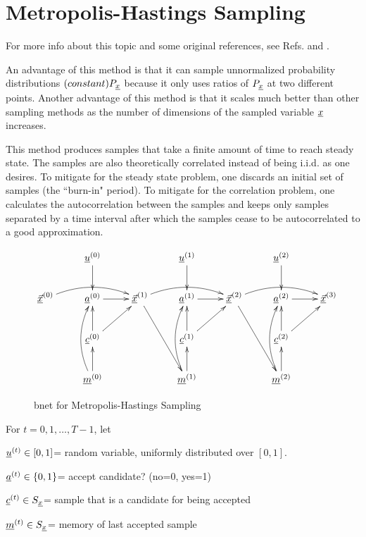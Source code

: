 \section{Metropolis-Hastings Sampling}

For more info about this topic and 
some original references, 
see Refs.\cite{bendel-metro-hast}
and \cite{wiki-metro-hast}.

An advantage of this method is that it can sample
unnormalized probability distributions
$(constant)P_{\underline{x}}$ 
because it 
only uses ratios of
$P_{\underline{x}}$ at two different points.
Another advantage
of this method
is that it scales much 
better than other sampling
methods as the number
of dimensions of the
sampled variable ${\underline{x}}$
increases.

This method produces samples that 
take a finite amount of
time to reach steady state. The samples
are also
theoretically correlated instead
of being i.i.d. as one desires.
To mitigate for the steady state problem,
one discards an initial set
of samples (the ``burn-in" period).
To mitigate for the correlation problem,
one calculates the autocorrelation
between the samples
and keeps only samples separated
by a time interval 
after which the samples 
cease to be autocorrelated to
a good approximation.



\begin{figure}[h!]
$$\xymatrix{
&\rvu^{(0)}\ar[d]
&&\rvu^{(1)}\ar[d]
&&\rvu^{(2)}\ar[d]
\\
\ul{\vecx}^{(0)}\ar@/^1pc/[rr]
&\rva^{(0)}\ar[r]
&
\ul{\vecx}^{(1)}\ar@/^1pc/[rr]\ar[rdd]
&\rva^{(1)}\ar[r]
&
\ul{\vecx}^{(2)}\ar@/^1pc/[rr]\ar[rdd]
&\rva^{(2)}\ar[r]
&\ul{\vecx}^{(3)}
\\
&\rvc^{(0)}\ar[u]\ar[ru]
&&\rvc^{(1)}\ar[u]\ar[ru]
&&\rvc^{(2)}\ar[u]\ar[ru]
\\
&\rvm^{(0)}\ar[u]\ar@/^1pc/[uu]
&&\rvm^{(1)}\ar[u]\ar@/^1pc/[uu]
&&\rvm^{(2)}\ar[u]\ar@/^1pc/[uu]
}$$
\caption{bnet for Metropolis-Hastings Sampling}
\label{fig-mcmc-metro-bnet}
\end{figure}

For $t=0, 1, \dots, T-1$, let

${\underline{u}}^{(t)}\in [0,1]$= random variable,
uniformly
distributed over $[0,1]$.

${\underline{a}}^{(t)}\in \{0,1\}$= accept candidate? (no=0, yes=1)

${\underline{c}}^{(t)}\in S_{\underline{x}}$= sample that is a 
candidate for being accepted

${\underline{m}}^{(t)}\in S_{\underline{x}}$= memory
of last accepted sample

